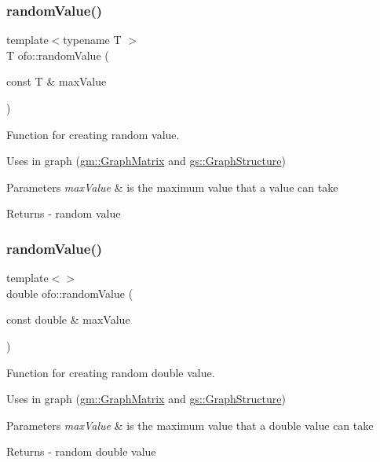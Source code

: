 \subsubsection{\texorpdfstring{random\+Value()}{randomValue()}\hspace{0.1cm}{\footnotesize\ttfamily [1/4]}}
{\footnotesize\ttfamily template$<$typename T $>$ \\
T ofo\+::random\+Value (\begin{DoxyParamCaption}\item[{const T \&}]{max\+Value }\end{DoxyParamCaption})}



Function for creating random value. 

Uses in graph (\mbox{\hyperlink{classgm_1_1_graph_matrix}{gm\+::\+Graph\+Matrix}} and \mbox{\hyperlink{classgs_1_1_graph_structure}{gs\+::\+Graph\+Structure}}) 
\begin{DoxyParams}{Parameters}
{\em max\+Value} & is the maximum value that a value can take \\
\hline
\end{DoxyParams}
\begin{DoxyReturn}{Returns}
-\/ random value 
\end{DoxyReturn}
\mbox{\label{namespaceofo_a159780949b5de21d2d8358df8abc0ce2}} 
\subsubsection{\texorpdfstring{random\+Value()}{randomValue()}\hspace{0.1cm}{\footnotesize\ttfamily [2/4]}}
{\footnotesize\ttfamily template$<$$>$ \\
double ofo\+::random\+Value (\begin{DoxyParamCaption}\item[{const double \&}]{max\+Value }\end{DoxyParamCaption})}



Function for creating random double value. 

Uses in graph (\mbox{\hyperlink{classgm_1_1_graph_matrix}{gm\+::\+Graph\+Matrix}} and \mbox{\hyperlink{classgs_1_1_graph_structure}{gs\+::\+Graph\+Structure}}) 
\begin{DoxyParams}{Parameters}
{\em max\+Value} & is the maximum value that a double value can take \\
\hline
\end{DoxyParams}
\begin{DoxyReturn}{Returns}
-\/ random double value 
\end{DoxyReturn}
\mbox{\label{namespaceofo_ab6b4775595276351b6c5485fa99649b3}} 
